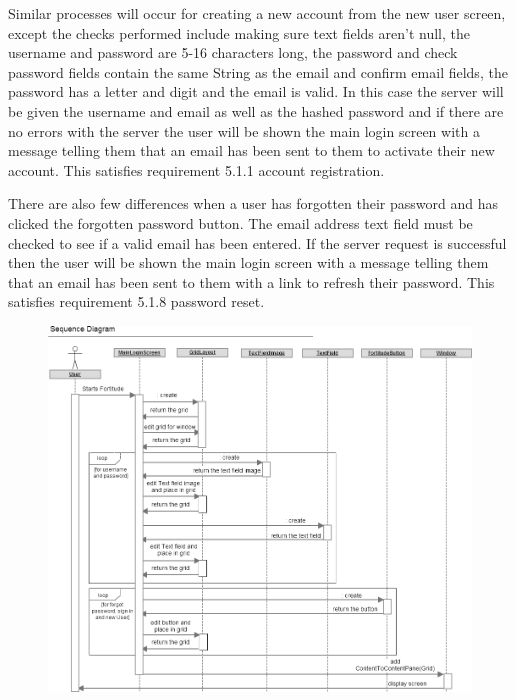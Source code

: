 Similar processes will occur for creating a new account from the new user screen, except the checks performed include making sure text fields aren't null, the username and password are 5-16 characters long, the password and check password fields contain the same String as the email and confirm email fields, the password has a letter and digit and the email is valid. In this case the server will be given the username and email as well as the hashed password and if there are no errors with the server the user will be shown the main login screen with a message telling them that an email has been sent to them to activate their new account. This satisfies requirement 5.1.1 account registration.

There are also few differences when a user has forgotten their password and has clicked the forgotten password button. The email address text field must be checked to see if a valid email has been entered. If the server request is successful then the user will be shown the main login screen with a message telling them that an email has been sent to them with a link to refresh their password. This satisfies requirement 5.1.8 password reset.

\begin{figure}[h!]
    \centering
    \includegraphics[width=\textwidth]{images/sequence/createMainLoginScreen}
\end{figure}

